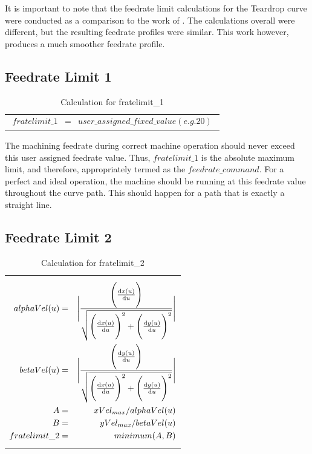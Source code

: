It is important to note that the feedrate limit calculations for the Teardrop curve were conducted as a comparison to the work of \cite{Zhong-etal:2018}. The calculations overall were different, but the resulting feedrate profiles were similar. This work however, produces a much smoother feedrate profile. 


\clearpage
\pagebreak

\subsection{Feedrate Limit 1}

\begin{table}[ht]
\begin{center}
\begin{tabular}{ p{14.0cm} }
\caption{Calculation for fratelimit\_1}
\begin{eqnarray}
	fratelimit\_1 & = & user\_assigned\_fixed\_value (e.g. 20) \nonumber
\end{eqnarray}
\end{tabular}
\end{center}
\end{table}

The machining feedrate during correct machine operation should never exceed this user assigned feedrate value. Thus, $fratelimit\_1$ is the absolute maximum limit, and therefore, appropriately termed as the $feedrate\_command$. For a perfect and ideal operation, the machine should be running at this feedrate value throughout the curve path. This should happen for a path that is exactly a straight line.

\subsection{Feedrate Limit 2}

\begin{table}[ht]
\begin{center}
\begin{tabular}{ p{14.0cm} }
\caption{Calculation for fratelimit\_2}
\begin{eqnarray}
	alphaVel(u) & = &  \Bigg | \frac { \Bigg (\odv{x(u)}{u} \Bigg) } { \sqrt { \Bigg( {\odv{x(u)}{u}} \Bigg )^{2} +  \Bigg ( {\odv{y(u)}{u}} \Bigg )^{2} } }  \Bigg |  \nonumber \\
	betaVel(u)  & = &  \Bigg | \frac { \Bigg (\odv{y(u)}{u} \Bigg) } { \sqrt { \Bigg( {\odv{x(u)}{u}} \Bigg )^{2} +  \Bigg ( {\odv{y(u)}{u}} \Bigg )^{2} } }  \Bigg |  \nonumber \\
    A & = & xVel_{max} / alphaVel(u) \nonumber \\
    B & = & yVel_{max} / betaVel(u)  \nonumber \\   
    fratelimit\_2 & = & minimum (A, B) \nonumber 
\end{eqnarray}
\end{tabular}
\end{center}
\end{table}

